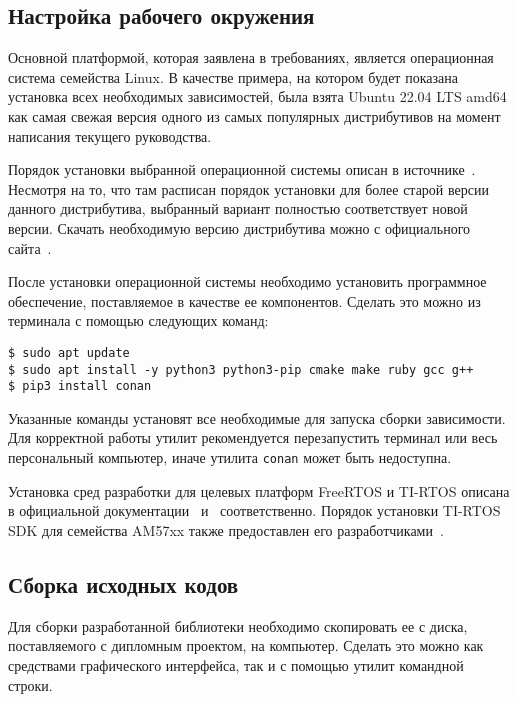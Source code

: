 \subsection{Настройка рабочего окружения}

Основной платформой, которая заявлена в требованиях,
является операционная система семейства Linux.
В качестве примера, на котором будет показана установка всех необходимых
зависимостей, была взята Ubuntu 22.04 LTS amd64 как самая свежая версия одного из самых популярных дистрибутивов на момент написания текущего руководства.


Порядок установки выбранной операционной системы описан в
источнике~\cite{ubuntu_how_to_install}. Несмотря на то, что там расписан порядок
установки для более старой версии данного дистрибутива, выбранный вариант
полностью соответствует новой версии.
Скачать необходимую версию дистрибутива можно с официального
сайта~\cite{ubuntu_download_site}.

После установки операционной системы необходимо установить программное
обеспечение, поставляемое в качестве ее компонентов. Сделать это можно из
терминала с помощью следующих команд:

\begin{lstlisting}
$ sudo apt update
$ sudo apt install -y python3 python3-pip cmake make ruby gcc g++
$ pip3 install conan
\end{lstlisting}

Указанные команды установят все необходимые для запуска сборки зависимости.
Для корректной работы утилит рекомендуется перезапустить терминал или весь
персональный компьютер, иначе утилита \lstinline{conan} может быть недоступна.

Установка сред разработки для целевых платформ FreeRTOS и TI-RTOS
описана в официальной документации~\cite{st_cubeide_install}
и~\cite{ti_ccs_install} соответственно.
Порядок установки TI-RTOS SDK для семейства AM57xx также
предоставлен его разработчиками~\cite{ti_sdk_install}.

\subsection{Сборка исходных кодов}

Для сборки разработанной библиотеки необходимо скопировать ее с диска, поставляемого
с дипломным проектом, на компьютер. Сделать это можно как средствами
графического интерфейса, так и с помощью утилит командной строки.

